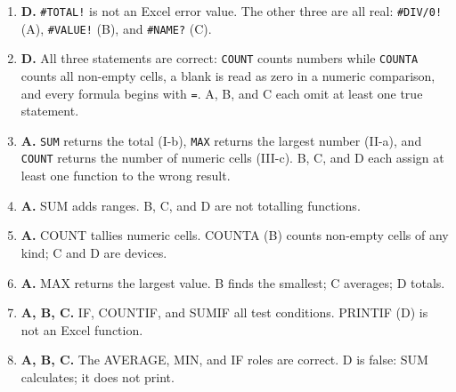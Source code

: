 \documentclass[11pt]{article}
\begin{document}
\begin{enumerate}[label=\textbf{Q\arabic*.}, leftmargin=*]
  (D) is division by zero.
\item \textbf{D.} \texttt{\#TOTAL!} is not an Excel error value. The other
  three are all real: \texttt{\#DIV/0!} (A), \texttt{\#VALUE!} (B), and
  \texttt{\#NAME?} (C).
\item \textbf{D.} All three statements are correct: \texttt{COUNT} counts
  numbers while \texttt{COUNTA} counts all non-empty cells, a blank is read as
  zero in a numeric comparison, and every formula begins with \texttt{=}. A,
  B, and C each omit at least one true statement.
\item \textbf{A.} \texttt{SUM} returns the total (I-b), \texttt{MAX} returns
  the largest number (II-a), and \texttt{COUNT} returns the number of numeric
  cells (III-c). B, C, and D each assign at least one function to the wrong
  result.

\item \textbf{A.} SUM adds ranges. B, C, and D are not totalling functions.
\item \textbf{A.} COUNT tallies numeric cells. COUNTA (B) counts non-empty cells of any kind; C and D are devices.
\item \textbf{A.} MAX returns the largest value. B finds the smallest; C averages; D totals.
\item \textbf{A, B, C.} IF, COUNTIF, and SUMIF all test conditions. PRINTIF (D) is not an Excel function.
\item \textbf{A, B, C.} The AVERAGE, MIN, and IF roles are correct. D is false: SUM calculates; it does not print.
\end{enumerate}
\def\JKSSBLessonID{26}
\def\JKSSBAnswers{1}

\end{document}
